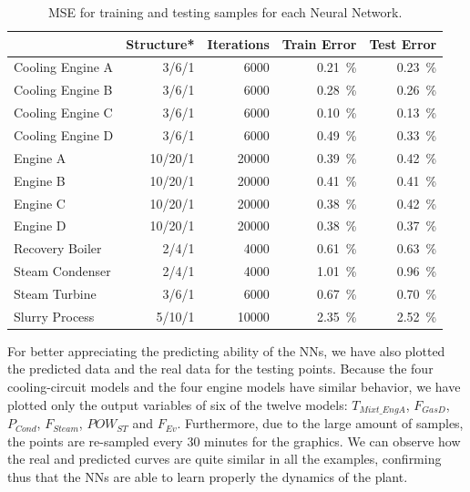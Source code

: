 \begin{table}[!t]
\caption{MSE for training and testing samples for each Neural Network.}
\label{tbl:mse}
  \centering
\begin{tabular}{lrrrr} \toprule
 & Structure* & Iterations & Train Error & Test Error \\ \midrule
Cooling Engine A & 3/6/1 & \num{6000} & \SI{0.21}{\percent} & \SI{0.23}{\percent} \\
Cooling Engine B & 3/6/1 & \num{6000} & \SI{0.28}{\percent} & \SI{0.26}{\percent} \\
Cooling Engine C & 3/6/1 & \num{6000} & \SI{0.10}{\percent} & \SI{0.13}{\percent} \\
Cooling Engine D & 3/6/1 & \num{6000} & \SI{0.49}{\percent} & \SI{0.33}{\percent} \\
 Engine A & 10/20/1 & \num{20000} & \SI{0.39}{\percent} & \SI{0.42}{\percent} \\
 Engine B & 10/20/1 & \num{20000} & \SI{0.41}{\percent} & \SI{0.41}{\percent} \\
 Engine C & 10/20/1 & \num{20000} & \SI{0.38}{\percent} & \SI{0.42}{\percent} \\
 Engine D & 10/20/1 & \num{20000} & \SI{0.38}{\percent} & \SI{0.37}{\percent} \\
 Recovery Boiler & 2/4/1 & \num{4000} & \SI{0.61}{\percent} & \SI{0.63}{\percent} \\
 Steam Condenser & 2/4/1 & \num{4000} & \SI{1.01}{\percent} & \SI{0.96}{\percent} \\
 Steam Turbine & 3/6/1 & \num{6000} & \SI{0.67}{\percent} & \SI{0.70}{\percent} \\
 Slurry Process & 5/10/1 & \num{10000} & \SI{2.35}{\percent} & \SI{2.52}{\percent} \\
 \bottomrule
\end{tabular}
\vspace{-0.3cm}

\end{table}


For better appreciating the predicting ability of the NNs, we have also plotted the predicted data and the real data for the testing points. Because the four cooling-circuit models and the four engine models have  similar behavior, we have plotted only the output variables of six of the twelve models: $T_{Mixt\_EngA}$, $F_{GasD}$, $P_{Cond}$, $F_{Steam}$, $POW_{ST}$ and $F_{Ev}$. Furthermore, due to the large amount of samples, the points are re-sampled every 30 minutes for the graphics. We can observe how the  real and predicted curves are quite similar in all the examples, confirming thus that the NNs are able to learn properly the dynamics of the plant.


